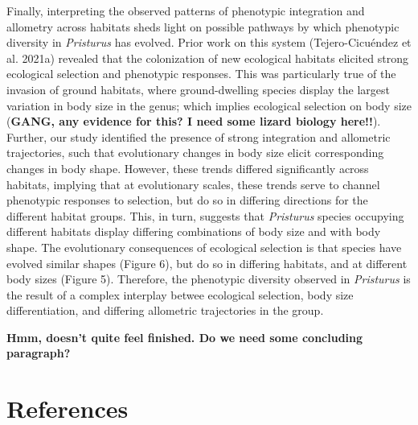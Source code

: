 \documentclass[
  11pt,
]{article}
\begin{document}
Finally, interpreting the observed patterns of phenotypic integration
and allometry across habitats sheds light on possible pathways by which
phenotypic diversity in \emph{Pristurus} has evolved. Prior work on this
system (Tejero-Cicuéndez et al. 2021a) revealed that the colonization of
new ecological habitats elicited strong ecological selection and
phenotypic responses. This was particularly true of the invasion of
ground habitats, where ground-dwelling species display the largest
variation in body size in the genus; which implies ecological selection
on body size (\textbf{GANG, any evidence for this? I need some lizard
biology here!!}). Further, our study identified the presence of strong
integration and allometric trajectories, such that evolutionary changes
in body size elicit corresponding changes in body shape. However, these
trends differed significantly across habitats, implying that at
evolutionary scales, these trends serve to channel phenotypic responses
to selection, but do so in differing directions for the different
habitat groups. This, in turn, suggests that \emph{Pristurus} species
occupying different habitats display differing combinations of body size
and with body shape. The evolutionary consequences of ecological
selection is that species have evolved similar shapes (Figure 6), but do
so in differing habitats, and at different body sizes (Figure 5).
Therefore, the phenotypic diversity observed in \emph{Pristurus} is the
result of a complex interplay betwee ecological selection, body size
differentiation, and differing allometric trajectories in the group.

\textbf{Hmm, doesn't quite feel finished. Do we need some concluding
paragraph?}

\newpage

\hypertarget{references}{%
\section*{References}\label{references}}

\setlength{\parindent}{-0.25in} \setlength{\leftskip}{0.25in}
\setlength{\parskip}{8pt} \noindent
\end{document}
